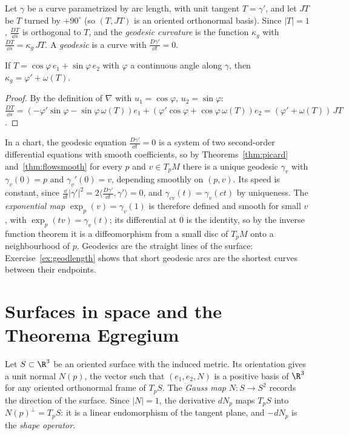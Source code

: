 \begin{definition}
Let $\gamma$ be a curve parametrized by arc length, with unit tangent $T=\gamma'$, and let $JT$ be $T$ turned by $+90^\circ$ (so $(T,JT)$ is an oriented
orthonormal basis). Since $|T|=1$, $\frac{DT}{\dd s}$ is orthogonal to $T$, and the \emph{geodesic curvature} is the function $\kappa_g$ with
$\frac{DT}{\dd s}=\kappa_g\,JT$. A \emph{geodesic} is a curve with $\frac{D\gamma'}{\dd t}=0$.
\end{definition}

\begin{proposition}\label{prop:kappag}
If $T=\cos\varphi\,e_1+\sin\varphi\,e_2$ with $\varphi$ a continuous angle along $\gamma$, then $\kappa_g=\varphi'+\omega(T)$.
\end{proposition}
\begin{proof}
By the definition of $\nabla$ with $u_1=\cos\varphi$, $u_2=\sin\varphi$: $\frac{DT}{\dd s}=(-\varphi'\sin\varphi-\sin\varphi\,\omega(T))e_1+(\varphi'\cos\varphi+\cos\varphi\,\omega(T))e_2=(\varphi'+\omega(T))\,JT$.
\end{proof}

In a chart, the geodesic equation $\frac{D\gamma'}{\dd t}=0$ is a system of two second-order differential equations with smooth coefficients, so by Theorems~\ref{thm:picard}
and~\ref{thm:flowsmooth} for every $p$ and $v\in T_pM$ there is a unique geodesic $\gamma_v$ with $\gamma_v(0)=p$ and $\gamma_v'(0)=v$, depending smoothly on $(p,v)$. Its speed is
constant, since $\frac{\dd}{\dd t}|\gamma'|^2=2\langle\frac{D\gamma'}{\dd t},\gamma'\rangle=0$, and $\gamma_{cv}(t)=\gamma_v(ct)$ by uniqueness. The \emph{exponential map}
$\exp_p(v)=\gamma_v(1)$ is therefore defined and smooth for small $v$, with $\exp_p(tv)=\gamma_v(t)$; its differential at $0$ is the identity, so by the inverse function
theorem it is a diffeomorphism from a small disc of $T_pM$ onto a neighbourhood of $p$. Geodesics are the straight lines of the surface: Exercise~\ref{ex:geodlength}
shows that short geodesic arcs are the shortest curves between their endpoints.

\section{Surfaces in space and the Theorema Egregium}

Let $S\subset\R^3$ be an oriented surface with the induced metric. Its orientation gives a unit normal $N(p)$, the vector such that $(e_1,e_2,N)$ is a positive basis of
$\R^3$ for any oriented orthonormal frame of $T_pS$. The \emph{Gauss map} $N\colon S\to S^2$ records the direction of the surface. Since $|N|=1$, the derivative $dN_p$
maps $T_pS$ into $N(p)^\perp=T_pS$: it is a linear endomorphism of the tangent plane, and $-dN_p$ is the \emph{shape operator}.

